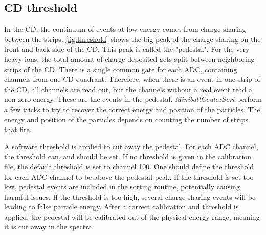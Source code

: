 \documentclass[twoside,english]{uiofysmaster/uiofysmaster}
\let\orgautoref\autoref
\renewcommand{\autoref}
        {%
		 \def\sectionautorefname{Section}%
		 \def\subsectionautorefname{Section}%
		 \def\subsubsectionautorefname{Section}%
		 \def\chapterautorefname{Chapter}%
          \orgautoref}
\begin{document}
\subsection{CD threshold}\label{ssec:threshold}
In the CD, the continuum of events at low energy comes from charge sharing between the strips.
\autoref{fig:threshold} shows the big peak of the charge sharing on the front and back side of the CD. 
This peak is called the "pedestal". 
For the very heavy ions, the total amount of charge deposited gets split between neighboring strips of the CD. 
There is a single common gate for each ADC, containing channels from one CD quadrant. 
Therefore, when there is an event in one strip of the CD, all channels are read out, but the channels without a real event read a non-zero energy.
These are the events in the pedestal.
\textsl{MiniballCoulexSort} perform a few tricks to try to recover the correct energy and position of the particles. 
The energy and position of the particles depends on counting the number of strips that fire.

A software threshold is applied to cut away the pedestal. 
For each ADC channel, the threshold can, and should be set. 
If no threshold is given in the calibration file, the default threshold is set to channel 100.
One should define the threshold for each ADC channel to be above the pedestal peak.
If the threshold is set too low, pedestal events are included in the sorting routine, potentially causing harmful issues.
If the threshold is too high, several charge-sharing events will be leading to false particle energy.
After a correct calibration and threshold is applied, the pedestal will be calibrated out of the physical energy range, meaning it is cut away in the spectra.
\end{document}
